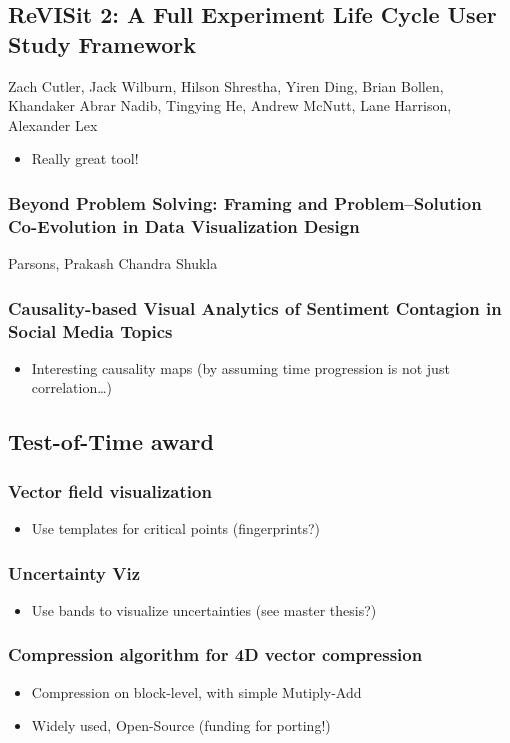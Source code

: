 \documentclass[a4paper]{article}
\begin{document}
\subsection{ReVISit 2: A Full Experiment Life Cycle User Study Framework}
Zach Cutler, Jack Wilburn, Hilson Shrestha, Yiren Ding, Brian Bollen, Khandaker Abrar Nadib, Tingying He, Andrew McNutt, Lane Harrison, Alexander Lex
\begin{itemize}
    \item Really great tool!
\end{itemize}

\subsubsection{Beyond Problem Solving: Framing and Problem–Solution Co-Evolution in Data Visualization Design }
Parsons, Prakash Chandra Shukla

\subsubsection{Causality-based Visual Analytics of Sentiment Contagion in Social Media Topics}
\begin{itemize}
    \item Interesting causality maps (by assuming time progression is not just correlation\dots)
\end{itemize}
\subsection{Test-of-Time award}

\subsubsection{Vector field visualization}
\begin{itemize}
    \item Use templates for critical points (fingerprints?)
\end{itemize}
\subsubsection{Uncertainty Viz}
\begin{itemize}
    \item Use bands to visualize uncertainties (see master thesis?)
\end{itemize}
\subsubsection{Compression algorithm for 4D vector compression}
\begin{itemize}
    \item Compression on block-level, with simple Mutiply-Add
    \item Widely used, Open-Source (funding for porting!)
\end{itemize}
\end{document}
